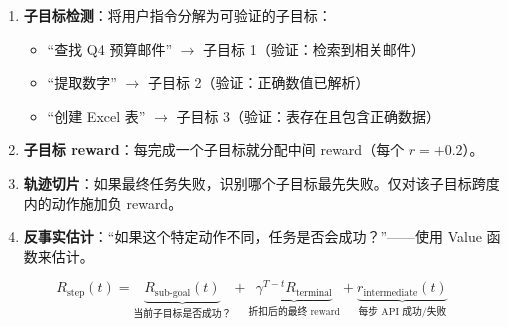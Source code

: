 \begin{enumerate}
  \item \textbf{子目标检测}：将用户指令分解为可验证的子目标：

\begin{itemize}
  \item ``查找 Q4 预算邮件'' $\rightarrow$ 子目标 1（验证：检索到相关邮件）
  \item ``提取数字'' $\rightarrow$ 子目标 2（验证：正确数值已解析）
  \item ``创建 Excel 表'' $\rightarrow$ 子目标 3（验证：表存在且包含正确数据）
\end{itemize}
  \item \textbf{子目标 reward}：每完成一个子目标就分配中间 reward（每个 $r = +0.2$）。
  \item \textbf{轨迹切片}：如果最终任务失败，识别哪个子目标最先失败。仅对该子目标跨度内的动作施加负 reward。
  \item \textbf{反事实估计}：``如果这个特定动作不同，任务是否会成功？''——使用 Value 函数来估计。
\end{enumerate}

\begin{equation}
R_{\text{step}}(t) = \underbrace{R_{\text{sub-goal}}(t)}_{\text{当前子目标是否成功？}} + \underbrace{\gamma^{T-t} R_{\text{terminal}}}_{\text{折扣后的最终 reward}} + \underbrace{r_{\text{intermediate}}(t)}_{\text{每步 API 成功/失败}}
\end{equation}

